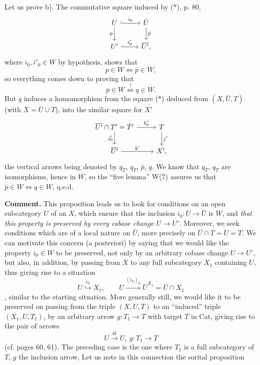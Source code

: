 Let us prove b). The commutative square induced by ($*$), p. 80,
\[
\begin{tikzcd}
U \arrow[r, hook, "i_0"] \arrow[d, "p"'] & \bar U \arrow[d, "\bar p"] \\
U' \arrow[r, hook, "i'_0"] & \overline{U'},
\end{tikzcd}
\]
where $i_0,i'_0\in W$ by hypothesis, shows that
\[
p\in W\iff\bar p\in W,
\]
so everything comes down to proving that
\[
\bar p\in W\overset{?}{\iff}q\in W.
\]
But $q$ induces a homomorphism from the square ($*$) deduced from $(X,\bar U,T)$ (with $X=\bar U\cup T$), into the similar square for $X'$
\[
\begin{tikzcd}
\overline{U'}\cap T'=\dot T' \arrow[r, "k'_0"] \arrow[d, "j'_0"'] & T \arrow[d, "j'"] \\ %
\overline{U'} \arrow[r, "k'"] & X',
\end{tikzcd}
\]
the vertical arrows being denoted by $q_{\dot T}$, $q_T$, $\bar p$, $q$.
We know that $q_{\dot T}$, $q_T$ are isomorphisms, hence in $W$, so the ``five lemma'' W(7) assures us that $\bar p\in W\iff q\in W$, q.e.d.

\textbf{Comment.} This proposition leads us to look for conditions on an open subcategory $U$ of an $X$, which ensure that the inclusion $i_0:U\longrightarrow\bar U$ is $W$, and \textit{that this property is preserved by every cobase change $U\longrightarrow U'$.} Moreover, we seek conditions which are of a local nature on $\bar U$, more precisely on $\bar U\cap T=\dot U=\dot T$. We can motivate this concern (a posteriori) by saying that we would like the property $i_0\in W$ to be preserved, not only by an arbitrary cobase change $U\longrightarrow U'$, but also, in addition, by passing from $X$ to any full subcategory $X_1$ containing $U$, thus giving rise to a situation
\[
U\overset{i_Y}{\hookrightarrow}X_1,\qquad U\xrightarrow{(i_Y)_0}\bar U^{X_1}=\bar U\cap X_1
\]
, similar to the starting situation. More generally still, we would like it to be preserved on passing from the triple $(X,U,T)$ to an ``induced'' triple $(X_1,U,T_1)$, by an arbitrary arrow $g:T_1\longrightarrow T$ with target $T$ in Cat, giving rise to the pair of arrows
\[
U\xrightarrow{\mathrm{id}}U,\ g:T_1\longrightarrow T
\]
(cf. pages 60, 61). The preceding case is the one where
$T_1$ is a full subcategory of $T$, $g$ the inclusion arrow, Let us note in this connection the sorital proposition %

